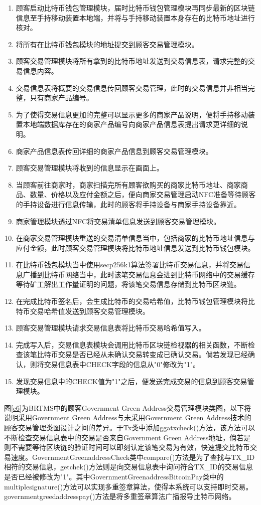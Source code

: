 	\begin{enumerate}
		\item 顾客启动比特币钱包管理模块，届时比特币钱包管理模块再同步最新的区块链信息至手持移动装置本地端，并将与手持移动装置本身存在的比特币地址进行核对。
		\item 将所有在比特币钱包模块的地址提交到顾客交易管理模块。
		\item 顾客交易管理模块将所有拿到的比特币地址发送到交易信息表，请求完整的交易信息内容。
		\item 交易信息表将概要的交易信息传回顾客交易管理，此时的交易信息并非相当完整，只有商家产品编号。
		\item 为了使得交易信息更加的完整可以显示更多的商家产品说明，便将手持移动装置本地端数据库存在的商家产品编号向商家产品信息表提出请求更详细的说明。
		\item 商家产品信息表传回详细的商家产品信息到顾客交易管理模块。
		\item 顾客交易管理模块将收到的信息显示在画面上。
		\item 当顾客前往商家时，商家扫描完所有顾客欲购买的商家比特币地址、商家商品、数量、价格以及应付金额之后，便向商家交易管理启动NFC准备等待顾客的手持设备进行信息传输，此时的顾客将手持设备与商家手持设备靠近。
		\item 商家管理模块透过NFC将交易清单信息发送到顾客交易管理模块。
		\item 在商家交易管理模块重送的交易清单信息当中，包括商家的比特币地址信息与应付金额，此时顾客交易管理模块将比特币地址信息发送到比特币钱包模块。
		\item 在比特币钱包模块当中使用secp256k1算法签署比特币交易信息，并将交易信息广播到比特币网络当中，此时该笔交易信息会进到⽐特币网络中的交易缓存等待矿工解出工作量证明的问题，将该笔交易信息存储到比特币区块链。
		\item 在完成比特币签名后，会生成比特币的交易哈希值，比特币钱包管理模块将比特币交易哈希值发送到顾客交易管理模块。
		\item 顾客交易管理模块请求交易信息表将比特币交易哈希值写入。
		\item 完成写入后，交易信息表模块会调用比特币区块链检视器的相关函数，不断检查该笔比特币交易是否已经从未确认交易转变成已确认交易。倘若发现已经确认，则将交易信息表中CHECK字段的信息从"0"修改为"1"。
		\item 发现交易信息中的CHECK值为"1"之后，便发送完成交易的信息到顾客交易管理模块。
	\end{enumerate}

	图\ref{c6}为BRTMS中的顾客Government Green Address交易管理模块类图，以下将说明采用Government Green Address与未采用Government Green Address技术的顾客交易管理类图设计之间的差异。于Tx类中添加ggatxcheck()方法，该方法可以不断检查交易信息表中的交易是否来自Government Green Address地址，倘若是则不需要等待区块链的验证时间可以即刻认定该笔交易为有效，快速提交比特币交易速度。GovernmentGreenaddressCheck类中compare()方法是为了查找与TX\_ID相符的交易信息，getchek()方法则是向交易信息表中询问符合TX\_ID的交易信息是否已经被修改为"1"。其中GovernmentGreenaddressBitcoinPay类中的multiplesignature()方法可以实现多重签章算法，使得本系统可以支持即时交易。governmentgreedaddresspay()方法是将多重签章算法广播报导比特币网络。


